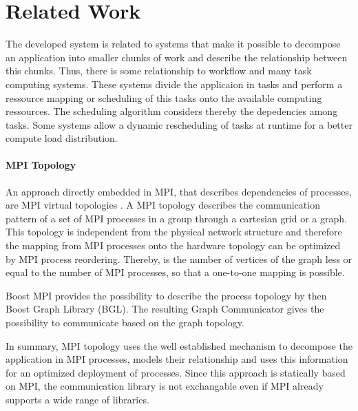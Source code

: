 \section{Related Work}
\label{sec:related_work}
The developed system is related to systems that make it possible to
decompose an application into smaller chunks of work and describe the
relationship between this chunks.  Thus, there is some relationship to
workflow and many task computing systems. These systems divide the
applicaion in tasks and perform a ressource mapping or scheduling of
this tasks onto the available computing ressources. The scheduling
algorithm considers thereby the depedencies among tasks. Some systems
allow a dynamic rescheduling of tasks at runtime for a better compute
load distribution.

\paragraph*{MPI Topology}
An approach directly embedded in MPI, that describes dependencies of
processes, are MPI virtual topologies \cite{ref:mpi_topology}. A MPI
topology describes the communication pattern of a set of MPI processes
in a group through a cartesian grid or a graph.  This topology is
independent from the physical network structure and therefore the
mapping from MPI processes onto the hardware topology can be optimized
by MPI process reordering. Thereby, is the number of vertices of the
graph less or equal to the number of MPI processes, so that a
one-to-one mapping is possible.

Boost MPI provides the possibility to describe the process topology by
then Boost Graph Library (BGL)\cite{ref:boost_bgl}.  The resulting
Graph Communicator \cite{ref:boost_graph_communicator} gives the
possibility to communicate based on the graph topology.

In summary, MPI topology uses the well established mechanism to
decompose the application in MPI processes, models their relationship
and uses this information for an optimized deployment of processes.
Since this approach is statically based on MPI, the communication
library is not exchangable even if MPI already supports a wide range
of libraries.

